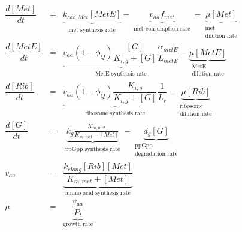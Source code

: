 \documentclass[10pt]{article}
\begin{document}
\clearpage
\small
\allowdisplaybreaks[1]
\begin{eqnarray}
 \dfrac{d [Met]}{d t} &=& \underbrace{k_{cat,Met}[MetE]}_{\substack{\text{met synthesis rate} }}-\underbrace{v_{aa}f_{met}}_{\substack{\text{met consumption rate}}}- \underbrace{\mu[Met]}_{\substack{\text{met} \\ \text{dilution rate}}} \label{eq:dadt_summary}\\
  \dfrac{d [MetE]}{d t} &=& \underbrace{v_{aa}(1-\phi_Q)\dfrac{[G]}{K_{i,g}+[G]}\dfrac{\alpha_{metE}}{L_{metE}}}_{\substack{\text{MetE synthesis rate} }} - \underbrace{\mu[MetE]}_{\substack{\text{MetE} \\ \text{dilution rate}}} \label{eq:drdt_summary} \\
\dfrac{d [Rib]}{d t} &=& \underbrace{v_{aa}(1-\phi_Q)\dfrac{K_{i,g}}{K_{i,g}+[G]}\dfrac{1}{L_{r}}}_{\substack{\text{ribosome synthesis rate} }}-\underbrace{\mu[Rib]}_{\substack{\text{ribosome} \\ \text{dilution rate}}} \label{eq:drdt_summary} \\
  \dfrac{d [G]}{d t} &=& \underbrace{k_g\frac{K_{m,met}}{K_{m,met}+[Met]}}_{\substack{\text{ppGpp synthesis rate}}}-\underbrace{d_{g}[G]}_{\substack{\text{ppGpp}\\\text{degradation rate}}} ~\label{eq:dgdt_summary}\\
  v_{aa} &=& \underbrace{\dfrac{k_{elong}[Rib][Met]}{K_{m,met}+[Met]}}_{\text{amino acid synthesis rate}} \\
    \mu &=& \underbrace{\dfrac{v_{aa}}{P_t}}_{\text{growth rate}}\label{eq:growth_rate_summary}
  \end{eqnarray}
\end{document}
